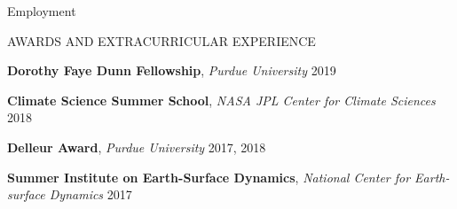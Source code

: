 \documentclass{resume_anzy} %
\begin{document}
\begin{rSection}{Employment}




\end{rSection}

\begin{rSection}{AWARDS AND EXTRACURRICULAR  EXPERIENCE}
\vspace{-2.5mm}
\item \textbf{Dorothy Faye Dunn Fellowship}, \textit{Purdue University} \hfill{2019}
\item \textbf{Climate Science Summer School}, \textit{NASA JPL Center for Climate Sciences} \hfill{2018}
\item \textbf{Delleur Award}, \textit{Purdue University} \hfill{2017, 2018}
\item \textbf{Summer Institute on Earth-Surface Dynamics}, \textit{National Center for Earth-surface Dynamics} \hfill{2017}
\end{rSection}
\end{document}
